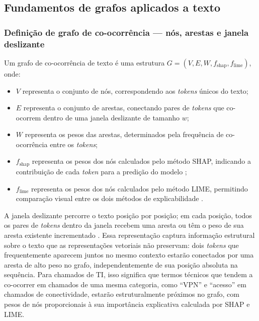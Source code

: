 \documentclass[
    12pt,                %
    openright,           %
    oneside,             %
    a4paper,             %
    english,             %
    brazil               %
]{abntex2}
\begin{document}
\subsection{Fundamentos de grafos aplicados a texto}
\label{subsec:grafos_fundamentos}

\subsubsection{Definição de grafo de co-ocorrência — nós, arestas e janela deslizante}
\label{subsubsec:grafos_definicao}

Um grafo de co-ocorrência de texto é uma estrutura 
$G = (V, E, W, f_{\text{shap}}, f_{\text{lime}})$, onde:

\begin{itemize}
    \item $V$ representa o conjunto de nós, correspondendo aos 
    \textit{tokens} únicos do texto;
    
    \item $E$ representa o conjunto de arestas, conectando pares 
    de \textit{tokens} que co-ocorrem dentro de uma janela 
    deslizante de tamanho $w$;
    
    \item $W$ representa os pesos das arestas, determinados pela 
    frequência de co-ocorrência entre os \textit{tokens};
    
    \item $f_{\text{shap}}$ representa os pesos dos nós calculados 
    pelo método SHAP, indicando a contribuição de cada 
    \textit{token} para a predição do modelo \cite{lundberg2017};
    
    \item $f_{\text{lime}}$ representa os pesos dos nós calculados 
    pelo método LIME, permitindo comparação visual entre os dois 
    métodos de explicabilidade \cite{ribeiro2016}.
\end{itemize}

A janela deslizante percorre o texto posição por posição; em cada 
posição, todos os pares de \textit{tokens} dentro da janela 
recebem uma aresta ou têm o peso de sua aresta existente 
incrementado \cite{yao2019}. Essa representação captura informação 
estrutural sobre o texto que as representações vetoriais não 
preservam: dois \textit{tokens} que frequentemente aparecem juntos 
no mesmo contexto estarão conectados por uma aresta de alto peso 
no grafo, independentemente de sua posição absoluta na sequência. 
Para chamados de TI, isso significa que termos técnicos que tendem 
a co-ocorrer em chamados de uma mesma categoria, como ``VPN'' e 
``acesso'' em chamados de conectividade, estarão estruturalmente 
próximos no grafo, com pesos de nós proporcionais à sua 
importância explicativa calculada por SHAP e LIME.
\end{document}
